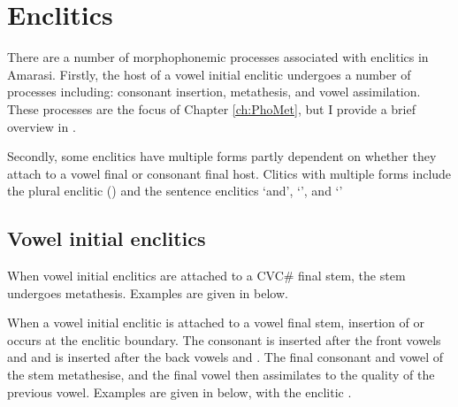 \section{Enclitics}\label{sec:CliBou}
There are a number of morphophonemic processes
associated with enclitics in Amarasi.
Firstly, the host of a vowel initial enclitic
undergoes a number of processes including:
consonant insertion, metathesis, and vowel assimilation.
These processes are the focus of Chapter \ref{ch:PhoMet},
but I provide a brief overview in .

Secondly, some enclitics have multiple forms
partly dependent on whether they attach to a vowel final
or consonant final host. Clitics with multiple forms
include the plural enclitic  ()
and the sentence enclitics  `and', 
`', and  `'

\subsection{Vowel initial enclitics}\label{sec:VowIniEnc}
When vowel initial enclitics are attached to a CVC{\#} final stem,
the stem undergoes metathesis. Examples are given in  below.

\begin{exe}
	\label{ex:CVC=V->VCC=V}
\end{exe}

When a vowel initial enclitic is attached to a vowel final stem,
insertion of \ve{\j} or  occurs at the enclitic boundary.
The consonant \ve{\j} is inserted after the front vowels  and  
and  is inserted after the back vowels  and .
The final consonant and vowel of the stem metathesise,
and the final vowel then assimilates to the quality of the previous vowel.
Examples are given in  below,
with the enclitic  {\ee}.

